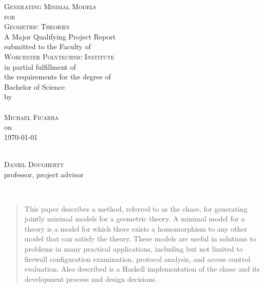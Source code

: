 \documentclass[11pt, a4paper]{article}
\begin{document}
\begin{titlepage}
\begin{center}
	\textsc{
			{\huge Generating Minimal Models}\\[0.2cm]
			{\large for}\\[0.3cm]
			{\huge Geometric Theories}
		}\\[1cm]
	A Major Qualifying Project Report\\
	submitted to the Faculty of\\[0.7cm]
	\textsc{ \large Worcester Polytechnic Institute }\\[0.7cm]
	in partial fulfillment of\\
	the requirements for the degree of\\
	Bachelor of Science\\[1cm]
	by\\[1cm]
	~\hspace{2cm}\dotfill\hspace{2cm}~\\
	\textsc{\Large Michael Ficarra}\\[1cm]
	on\\[1cm]
	{\Large \today}\\
	\vfill
	\begin{flushright}
		\hspace{8cm}\dotfill \\
		\textsc{Daniel Dougherty}\\
		professor, project advisor\\
	\end{flushright}
\end{center}
\end{titlepage}



~\\
\vfill
\begin{abstract}
This paper describes a method, referred to as the chase, for generating jointly
minimal models for a geometric theory. A minimal model for a theory is a model
for which there exists a homomorphism to any other model that can satisfy the
theory. These models are useful in solutions to problems in many practical
applications, including but not limited to firewall configuration examination,
protocol analysis, and access control evaluation. Also described is a Haskell
implementation of the chase and its development process and design decisions.
\end{abstract}
\vfill
~\\
\newpage
\end{document}
